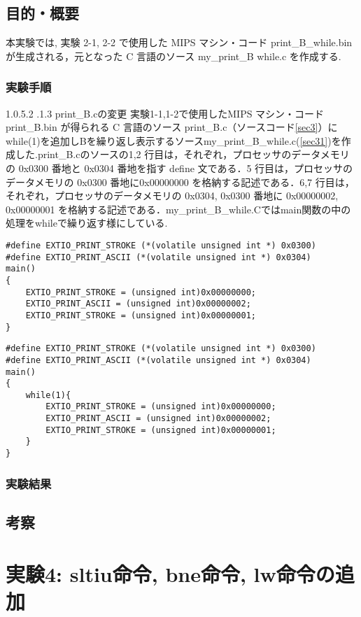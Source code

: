 \documentclass[epsf,a4paper,dvipdfmx,autodetect-engine,titlepage]{jsarticle}
\makeatletter
\newcommand{\subsubsubsection}
{\@startsection{paragraph}{4}{\z@}%
{1.0\Cvs \@plus.5\Cdp \@minus.2\Cdp}%
{.1\Cvs \@plus.3\Cdp}%
{\reset@font\sffamily\normalsize}}
\makeatother
\begin{document}
\subsection{目的・概要}
本実験では, 実験 2-1, 2-2 で使用した MIPS マシン・コード print\_B\_while.bin が生成される，元となった C 言語のソース my\_print\_B while.c を作成する. 
\subsubsection{実験手順}
\subsubsubsection{print\_B.cの変更}
実験1-1,1-2で使用したMIPS マシン・コード print\_B.bin が得られる C 言語のソース print\_B.c（ソースコード\ref{sec3}）にwhile(1)を追加しBを繰り返し表示するソースmy\_print\_B\_while.c(\ref{sec31})を作成した.print\_B.cのソースの1,2 行目は，それぞれ，プロセッサのデータメモリの 0x0300 番地と 0x0304 番地を指す define 文である．5 行目は，プロセッサのデータメモリの 0x0300 番地に0x00000000 を格納する記述である．6,7 行目は，それぞれ，プロセッサのデータメモリの 0x0304, 0x0300 番地に 0x00000002, 0x00000001 を格納する記述である．my\_print\_B\_while.Cではmain関数の中の処理をwhileで繰り返す様にしている.
\begin{lstlisting}[caption=print\_B.c, label=sec3]
#define EXTIO_PRINT_STROKE (*(volatile unsigned int *) 0x0300)
#define EXTIO_PRINT_ASCII (*(volatile unsigned int *) 0x0304)
main()
{
    EXTIO_PRINT_STROKE = (unsigned int)0x00000000;
    EXTIO_PRINT_ASCII = (unsigned int)0x00000002;
    EXTIO_PRINT_STROKE = (unsigned int)0x00000001;
}
\end{lstlisting}
\begin{lstlisting}[caption=my\_print\_B\_while.c, label=sec31]
#define EXTIO_PRINT_STROKE (*(volatile unsigned int *) 0x0300)
#define EXTIO_PRINT_ASCII (*(volatile unsigned int *) 0x0304)
main()
{
    while(1){
        EXTIO_PRINT_STROKE = (unsigned int)0x00000000;
        EXTIO_PRINT_ASCII = (unsigned int)0x00000002;
        EXTIO_PRINT_STROKE = (unsigned int)0x00000001;
    }
}
\end{lstlisting}
\subsubsection{実験結果}
\subsection{考察}

\section{実験4: sltiu命令, bne命令, lw命令の追加}
\end{document}
